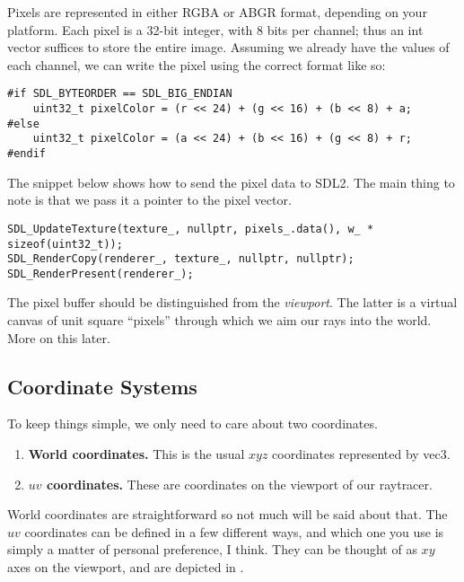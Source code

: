 \documentclass{scrartcl}
\begin{document}
Pixels are represented in either RGBA or ABGR format, depending on your platform.
Each pixel is a 32-bit integer, with 8 bits per channel; thus an int vector suffices to store the entire image.
Assuming we already have the values of each channel, we can write the pixel using the correct format like so:

\begin{verbatim}
#if SDL_BYTEORDER == SDL_BIG_ENDIAN
    uint32_t pixelColor = (r << 24) + (g << 16) + (b << 8) + a;
#else
    uint32_t pixelColor = (a << 24) + (b << 16) + (g << 8) + r;
#endif
\end{verbatim}

The snippet below shows how to send the pixel data to SDL2.
The main thing to note is that we pass it a pointer to the pixel vector.

\begin{verbatim}
SDL_UpdateTexture(texture_, nullptr, pixels_.data(), w_ * sizeof(uint32_t));
SDL_RenderCopy(renderer_, texture_, nullptr, nullptr);
SDL_RenderPresent(renderer_);
\end{verbatim}

\begin{mdframed}
The pixel buffer should be distinguished from the \emph{viewport}.
The latter is a virtual canvas of unit square ``pixels'' through which we aim our rays into the world.
More on this later.
\end{mdframed}

\subsection{Coordinate Systems}
\label{sec:coords}

To keep things simple, we only need to care about two coordinates.

\begin{enumerate}

\item \textbf{World coordinates.}
This is the usual $xyz$ coordinates represented by vec3.

\item \textbf{$uv$ coordinates.}
These are coordinates on the viewport of our raytracer.
\end{enumerate}

World coordinates are straightforward so not much will be said about that.
The $uv$ coordinates can be defined in a few different ways, and which one you use is simply a matter of personal preference, I think.
They can be thought of as $xy$ axes on the viewport, and are depicted in .
\end{document}
